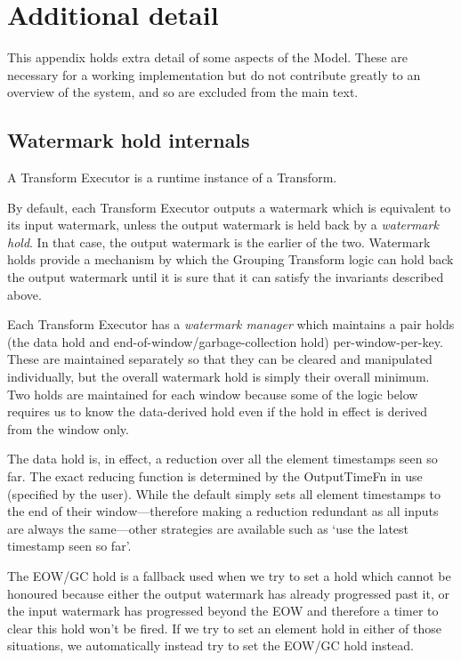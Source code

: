 \chapter{Additional detail}\label{apx:aditional}

This appendix holds extra detail of some aspects of the Model.
These are necessary for a working implementation but do not contribute greatly to an overview of the system, and so are excluded from the main text.

\section{Watermark hold internals}\label{apx:additional:watermark-holds}

A Transform Executor is a runtime instance of a Transform.

By default, each Transform Executor outputs a watermark which is equivalent to its input watermark, unless the output watermark is held back by a \emph{watermark hold}.
In that case, the output watermark is the earlier of the two.
Watermark holds provide a mechanism by which the Grouping Transform logic can hold back the output watermark until it is sure that it can satisfy the invariants described above.

Each Transform Executor has a \emph{watermark manager} which maintains a pair holds (the data hold and end-of-window/garbage-collection hold) per-window-per-key.
These are maintained separately so that they can be cleared and manipulated individually, but the overall watermark hold is simply their overall minimum.
Two holds are maintained for each window because some of the logic below requires us to know the data-derived hold even if the hold in effect is derived from the window only.

The data hold is, in effect, a reduction over all the element timestamps seen so far.
The exact reducing function is determined by the OutputTimeFn in use (specified by the user).
While the default simply sets all element timestamps to the end of their window---therefore making a reduction redundant as all inputs are always the same---other strategies are available such as `use the latest timestamp seen so far'.

The EOW/GC hold is a fallback used when we try to set a hold which cannot be honoured because either the output watermark has already progressed past it, or the input watermark has progressed beyond the EOW and therefore a timer to clear this hold won't be fired.
If we try to set an element hold in either of those situations, we automatically instead try to set the EOW/GC hold instead.

